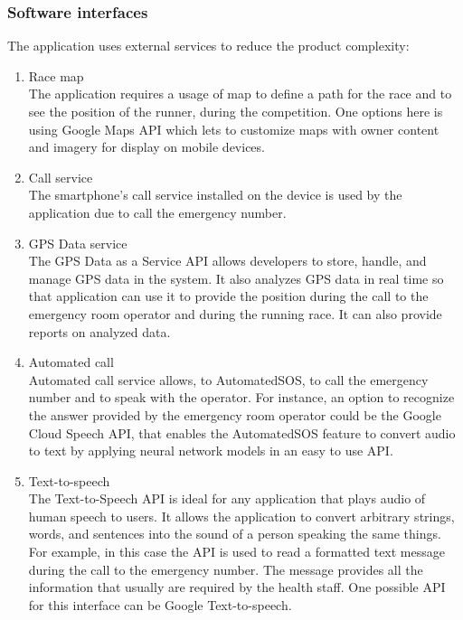 \subsubsection{Software interfaces}
The application uses external services to reduce the product complexity:
\begin{enumerate}
\item Race map\\
The application requires a usage of map to define a path for the race and to see the position of the runner, during the competition. One options here is using Google Maps API which lets to customize maps with owner content and imagery for display on mobile devices. 
\item Call service\\
The smartphone's call service installed on the device is used by the application due to call the emergency number.
\item GPS Data service\\
The GPS Data as a Service API allows developers to store, handle, and manage GPS data in the system. It also analyzes GPS data in real time so that application can use it to provide the position during the call to the emergency room operator and during the running race. It can also provide reports on analyzed data. 
\item Automated call\\
Automated call service allows, to AutomatedSOS, to call the emergency number and to speak with the operator.
For instance, an option to recognize the answer provided by the emergency room operator could be the Google Cloud Speech API, that enables the AutomatedSOS feature to convert audio to text by applying neural network models in an easy to use API. 
\item Text-to-speech\\
The Text-to-Speech API is ideal for any application that plays audio of human speech to users. It allows the application to convert arbitrary strings, words, and sentences into the sound of a person speaking the same things. For example, in this case the API is used to read a formatted text message during the call to the emergency number. The message provides all the information that usually are required by the health staff. One possible API for this interface can be Google Text-to-speech.
\end{enumerate}
